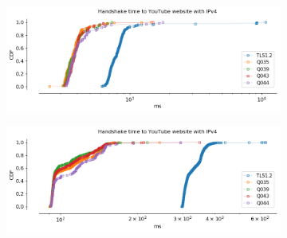 \begin{frame}

\begin{figure}[!htb]
    
    \begin{subfigure}{0.45\textwidth}
        \includegraphics[width=\linewidth]{./plots/youtube/india/graph_website_connect_time.png}
    \end{subfigure}
    \begin{subfigure}{0.45\textwidth}
        \includegraphics[width=\linewidth]{./plots/youtube/munich/graph_website_connect_time.png}
    \end{subfigure}    
    \caption{}
\end{figure}

%

\begin{figure}[!htb]
    

\end{figure}
\end{frame}
